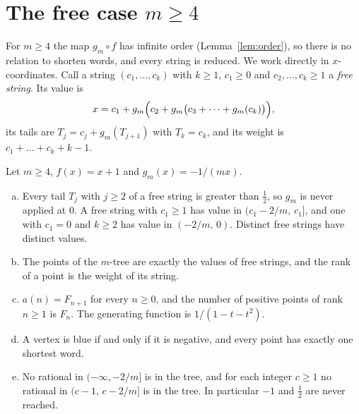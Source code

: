 \section{The free case \texorpdfstring{$m\ge4$}{m >= 4}}\label{sec:free}

For $m\ge4$ the map $g_m\circ f$ has infinite order (Lemma~\ref{lem:order}), so there is no relation
to shorten words, and every string is reduced. We work directly in $x$-coordinates. Call a string
$(c_1,\dots,c_k)$ with $k\ge1$, $c_1\ge0$ and $c_2,\dots,c_k\ge1$ a \emph{free string}. Its value is
\[
x=c_1+g_m\Bigl(c_2+g_m\bigl(c_3+\dots+g_m(c_k)\bigr)\Bigr),
\]
its tails are $T_j=c_j+g_m(T_{j+1})$ with $T_k=c_k$, and its weight is $c_1+\dots+c_k+k-1$.

\begin{theorem}[Theorem~E]\label{thm:free}
Let $m\ge4$, $f(x)=x+1$ and $g_m(x)=-1/(mx)$.
\begin{enumerate}[(a)]
\item Every tail $T_j$ with $j\ge2$ of a free string is greater than $\tfrac12$, so $g_m$ is never applied
at $0$. A free string with $c_1\ge1$ has value in $(c_1-2/m,\,c_1]$, and one with $c_1=0$ and $k\ge2$ has
value in $(-2/m,\,0)$. Distinct free strings have distinct values.
\item The points of the $m$-tree are exactly the values of free strings, and the rank of a point is the
weight of its string.
\item $a(n)=F_{n+1}$ for every $n\ge0$, and the number of positive points of rank $n\ge1$ is $F_n$.
The generating function is $1/(1-t-t^2)$.
\item A vertex is blue if and only if it is negative, and every point has exactly one shortest word.
\item No rational in $(-\infty,-2/m]$ is in the tree, and for each integer $c\ge1$ no rational in
$(c-1,\,c-2/m]$ is in the tree. In particular $-1$ and $\tfrac12$ are never reached.
\end{enumerate}
\end{theorem}

